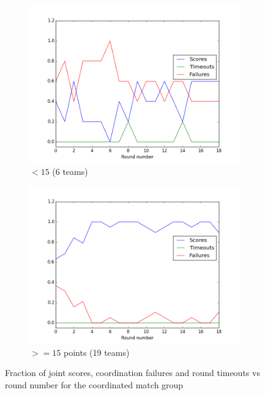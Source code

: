 \begin{figure}
\centering
\begin{subfigure}{.5\textwidth}
\centering
\includegraphics[width=\columnwidth]{figures/scores_coordinated_rest.png}
\caption{$< 15$ (6 teams)}
\label{fig:scores_coordinated_rest}
\end{subfigure}%
\begin{subfigure}{.5\textwidth}
\centering
\includegraphics[width=\columnwidth]{figures/scores_coordinated_15.png}
\caption{$>= 15$ points (19 teams)}
\label{fig:scores_coordinated_15}
\end{subfigure}
\caption{Fraction of joint scores, coordination failures and round timeouts vs round number for the coordinated match group}
\label{fig:scores_coordinated}
\end{figure}

